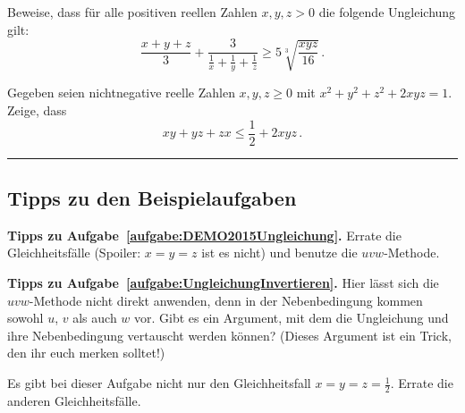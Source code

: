 \begin{aufgabe*}\label{aufgabe:DEMO2015Ungleichung}
	Beweise, dass für alle positiven reellen Zahlen $x,y,z>0$ die folgende Ungleichung gilt:
	\begin{equation*}
		\frac{x+y+z}{3}+\frac{3}{\frac1x+\frac1y+\frac1z}\geqslant 5\sqrt[3]{\frac{xyz}{16}}\,.
	\end{equation*}
\end{aufgabe*}
\begin{aufgabe*}[*]\label{aufgabe:UngleichungInvertieren}
	Gegeben seien nichtnegative reelle Zahlen $x,y,z\geqslant 0$ mit $x^2+y^2+z^2+2xyz=1$. Zeige, dass
	\begin{equation*}
		xy+yz+zx\leqslant \frac12+2xyz\,.
	\end{equation*}
\end{aufgabe*}

\vfill\hrule\vspace{-1em}

\subsection*{Tipps zu den Beispielaufgaben}
\textbf{Tipps zu Aufgabe~\ref{aufgabe:DEMO2015Ungleichung}.} Errate die Gleichheitsfälle (Spoiler: $x=y=z$ ist es nicht) und benutze die $uvw$-Methode.	

\textbf{Tipps zu Aufgabe~\ref{aufgabe:UngleichungInvertieren}.} Hier lässt sich die $uvw$-Methode nicht direkt anwenden, denn in der Nebenbedingung kommen sowohl $u$, $v$ als auch $w$ vor. Gibt es ein Argument, mit dem die Ungleichung und ihre Nebenbedingung vertauscht werden können? (Dieses Argument ist ein Trick, den ihr euch merken solltet!)

Es gibt bei dieser Aufgabe nicht nur den Gleichheitsfall $x=y=z=\frac12$. Errate die anderen Gleichheitsfälle.